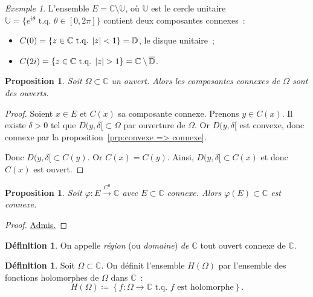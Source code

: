 \documentclass{report}
\newtheorem{prp}[thm]{Proposition}
\theoremstyle{definition}
\newtheorem{déf}[thm]{Définition}
\theoremstyle{remark}
\newtheorem{ex}{Exemple}[chapter]
\numberwithin{equation}{section}
\newcommand{\C}{\mathbb C}
\newcommand{\tq}{\text{ t.q. }}
\newcommand{\toC}[1]{\xrightarrow{C^{#1}}}
\newcommand{\tocont}{\toC 0}
\newcommand{\grantedproof}{\begin{proof} \underline{Admis.} \end{proof}}
\begin{document}
			\begin{ex} L'ensemble $E = \C \setminus \mathbb U$, où $\mathbb U$ est le cercle unitaire $\mathbb U = \{e^{i\theta} \tq \theta \in [0, 2\pi]\}$
			contient deux composantes connexes~:
			\begin{itemize}
				\item $C(0) = \{z \in \C \tq \abs z < 1\} = \mathbb D$, le disque unitaire~;
				\item $C(2i) = \{z \in \C \tq \abs z > 1\} = \C \setminus \overline {\mathbb D}$.
			\end{itemize}
			\end{ex}


			\begin{prp} Soit $\Omega \subset \C$ un ouvert. Alors les composantes connexes de $\Omega$ sont des ouverts.
			\end{prp}

			\begin{proof} Soient $x \in E$ et $C(x)$ sa composante connexe. Prenons $y \in C(x)$. Il existe $\delta > 0$ tel que $D(y, \delta[ \subset \Omega$
			par ouverture de $\Omega$. Or $D(y, \delta[$ est convexe, donc connexe par la proposition~\ref{prp:convexe => connexe}.

			Donc $D(y, \delta[ \subset C(y)$. Or $C(x) = C(y)$. Ainsi, $D(y, \delta[ \subset C(x)$ et donc $C(x)$ est ouvert.
			\end{proof}

			\begin{prp}\label{prp:continuité conserve connexité} Soit $\varphi : E \tocont \C$ avec $E \subset \C$ connexe. Alors $\varphi(E) \subset \C$ est connexe.
			\end{prp}

			\grantedproof

			\begin{déf} On appelle \textit{région} (ou \textit{domaine}) \textit{de $\C$} tout ouvert connexe de $\C$.
			\end{déf}

			\begin{déf} Soit $\Omega \subset \C$. On définit l'ensemble $H(\Omega)$ par l'ensemble des fonctions holomorphes de $\Omega$ dans $\C$~:
			\begin{equation}
				H(\Omega) \coloneqq \left\{f : \Omega \to \C \tq f \text{ est holomorphe}\right\}.
			\end{equation}
			\end{déf}
\end{document}
